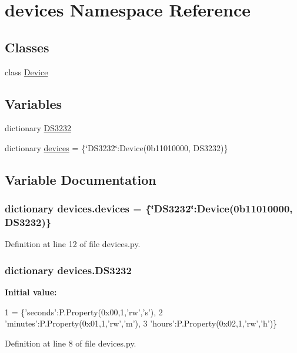 \hypertarget{namespacedevices}{}\section{devices Namespace Reference}
\label{namespacedevices}
\subsection*{Classes}
\begin{DoxyCompactItemize}
\item 
class \hyperlink{classdevices_1_1_device}{Device}
\end{DoxyCompactItemize}
\subsection*{Variables}
\begin{DoxyCompactItemize}
\item 
dictionary \hyperlink{namespacedevices_af42f15b4c5bc8d5f499fb47dacc49e68}{D\+S3232}
\item 
dictionary \hyperlink{namespacedevices_a7ad239def5188808ed97f20de8018429}{devices} = \{\char`\"{}D\+S3232\char`\"{}\+:Device(0b11010000, D\+S3232)\}
\end{DoxyCompactItemize}


\subsection{Variable Documentation}
\subsubsection[{\texorpdfstring{devices}{devices}}]{\setlength{\rightskip}{0pt plus 5cm}dictionary devices.\+devices = \{\char`\"{}D\+S3232\char`\"{}\+:Device(0b11010000, D\+S3232)\}}\hypertarget{namespacedevices_a7ad239def5188808ed97f20de8018429}{}\label{namespacedevices_a7ad239def5188808ed97f20de8018429}


Definition at line 12 of file devices.\+py.

\subsubsection[{\texorpdfstring{D\+S3232}{DS3232}}]{\setlength{\rightskip}{0pt plus 5cm}dictionary devices.\+D\+S3232}\hypertarget{namespacedevices_af42f15b4c5bc8d5f499fb47dacc49e68}{}\label{namespacedevices_af42f15b4c5bc8d5f499fb47dacc49e68}
{\bfseries Initial value\+:}
\begin{DoxyCode}
1 = \{\textcolor{stringliteral}{'seconds'}:P.Property(0x00,1,\textcolor{stringliteral}{'rw'},\textcolor{stringliteral}{'s'}),
2           \textcolor{stringliteral}{'minutes'}:P.Property(0x01,1,\textcolor{stringliteral}{'rw'},\textcolor{stringliteral}{'m'}),
3           \textcolor{stringliteral}{'hours'}:P.Property(0x02,1,\textcolor{stringliteral}{'rw'},\textcolor{stringliteral}{'h'})\}
\end{DoxyCode}


Definition at line 8 of file devices.\+py.


